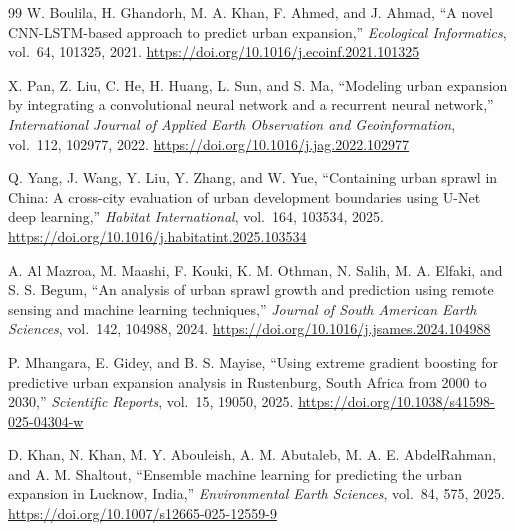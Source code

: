 \documentclass[12pt,a4paper]{article}
\begin{document}
\begin{thebibliography}{99}
W. Boulila, H. Ghandorh, M. A. Khan, F. Ahmed, and J. Ahmad, ``A novel CNN-LSTM-based approach to predict urban expansion,'' \textit{Ecological Informatics}, vol.~64, 101325, 2021.
\url{https://doi.org/10.1016/j.ecoinf.2021.101325}

X. Pan, Z. Liu, C. He, H. Huang, L. Sun, and S. Ma, ``Modeling urban expansion by integrating a convolutional neural network and a recurrent neural network,'' \textit{International Journal of Applied Earth Observation and Geoinformation}, vol.~112, 102977, 2022.
\url{https://doi.org/10.1016/j.jag.2022.102977}

Q. Yang, J. Wang, Y. Liu, Y. Zhang, and W. Yue, ``Containing urban sprawl in China: A cross-city evaluation of urban development boundaries using U-Net deep learning,'' \textit{Habitat International}, vol.~164, 103534, 2025.
\url{https://doi.org/10.1016/j.habitatint.2025.103534}

A. Al Mazroa, M. Maashi, F. Kouki, K. M. Othman, N. Salih, M. A. Elfaki, and S. S. Begum, ``An analysis of urban sprawl growth and prediction using remote sensing and machine learning techniques,'' \textit{Journal of South American Earth Sciences}, vol.~142, 104988, 2024.
\url{https://doi.org/10.1016/j.jsames.2024.104988}

P. Mhangara, E. Gidey, and B. S. Mayise, ``Using extreme gradient boosting for predictive urban expansion analysis in Rustenburg, South Africa from 2000 to 2030,'' \textit{Scientific Reports}, vol.~15, 19050, 2025.
\url{https://doi.org/10.1038/s41598-025-04304-w}

D. Khan, N. Khan, M. Y. Abouleish, A. M. Abutaleb, M. A. E. AbdelRahman, and A. M. Shaltout, ``Ensemble machine learning for predicting the urban expansion in Lucknow, India,'' \textit{Environmental Earth Sciences}, vol.~84, 575, 2025.
\url{https://doi.org/10.1007/s12665-025-12559-9}

\end{thebibliography}
\end{document}
